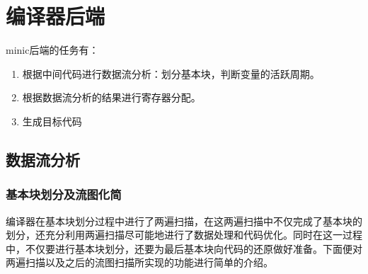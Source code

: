 \documentclass[12pt,a4paper,Flow]{report}
\begin{document}
\chapter{编译器后端}
minic后端的任务有：
\begin{enumerate}
\item 根据中间代码进行数据流分析：划分基本块，判断变量的活跃周期。
\item 根据数据流分析的结果进行寄存器分配。
\item 生成目标代码
\end{enumerate}
\newpage
\section{数据流分析}
\subsection{基本块划分及流图化简}
编译器在基本块划分过程中进行了两遍扫描，在这两遍扫描中不仅完成了基本块的划分，还充分利用两遍扫描尽可能地进行了数据处理和代码优化。同时在这一过程中，不仅要进行基本块划分，还要为最后基本块向代码的还原做好准备。下面便对两遍扫描以及之后的流图扫描所实现的功能进行简单的介绍。
\end{document}
